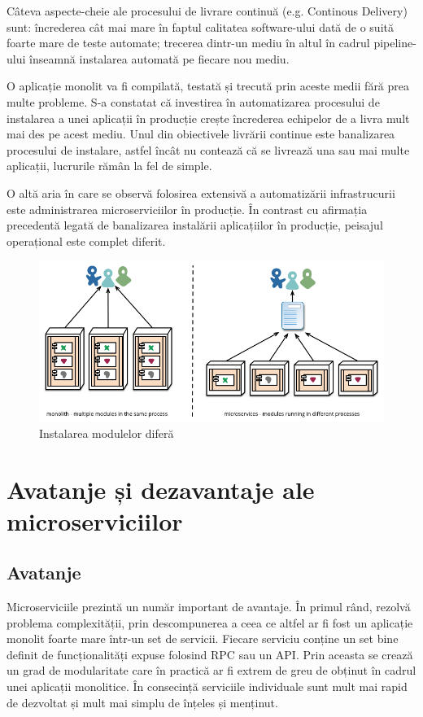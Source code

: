 \documentclass[12pt, a4paper, oneside, romanian]{teza-upb}
\begin{document}
Câteva aspecte-cheie ale procesului de livrare continuă (e.g. Continous Delivery) sunt: încrederea cât mai mare în faptul calitatea software-ului dată de o suită foarte mare de teste automate; trecerea dintr-un mediu în altul în cadrul pipeline-ului înseamnă instalarea automată pe fiecare nou mediu. 

O aplicație monolit va fi compilată, testată și trecută prin aceste medii fără prea multe probleme. S-a constatat că investirea în automatizarea procesului de instalarea a unei aplicații în producție crește încrederea echipelor de a livra mult mai des pe acest mediu. Unul din obiectivele livrării continue este banalizarea procesului de instalare, astfel încât nu contează că se livrează una sau mai multe aplicații, lucrurile rămân la fel de simple. 

O altă aria în care se observă folosirea extensivă a automatizării infrastrucurii este administrarea microserviciilor în producție. În contrast cu afirmația precedentă legată de banalizarea instalării aplicațiilor în producție, peisajul operațional este complet diferit. 

\begin{figure}[ht]
\centering
\includegraphics[scale=0.6]{img/micro-deployment.png}
\caption{Instalarea modulelor diferă}
\label{fig:arhi_componente}
\end{figure}

\section{Avatanje și dezavantaje ale microserviciilor}
\subsection{Avatanje}
Microserviciile prezintă un număr important de avantaje. În primul rând, rezolvă problema complexității, prin descompunerea a ceea ce altfel ar fi fost un aplicație monolit foarte mare într-un set de servicii. Fiecare serviciu conține un set bine definit de funcționalități expuse folosind RPC sau un API. Prin aceasta se crează un grad de modularitate care în practică ar fi extrem de greu de obținut în cadrul unei aplicații monolitice. În consecință serviciile individuale sunt mult mai rapid de dezvoltat și mult mai simplu de înțeles și menținut. 
\end{document}
